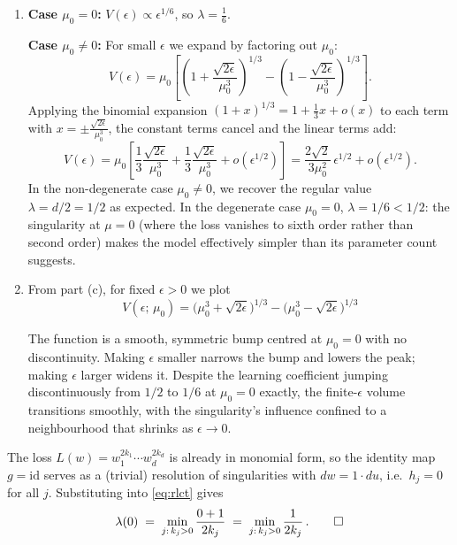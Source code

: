 \documentclass[11pt]{article}
\begin{document}
\begin{solution}
\begin{enumerate}
    \item
        \textbf{Case $\mu_0 = 0$:}
        $V(\epsilon) \propto \epsilon^{1/6}$, so
        $\lambda = \tfrac{1}{6}$.

        \textbf{Case $\mu_0 \neq 0$:}
        For small $\epsilon$ we expand by factoring out $\mu_0$:
\[
    V(\epsilon)
    = \mu_0 \left[
        \left(1 + \frac{\sqrt{2\epsilon}}{\mu_0^3}\right)^{\!1/3}
        - \left(1 - \frac{\sqrt{2\epsilon}}{\mu_0^3}\right)^{\!1/3}
    \right].
\]
Applying the binomial expansion $(1+x)^{1/3} = 1 + \tfrac{1}{3}x + o(x)$ to each term with $x = \pm\frac{\sqrt{2\epsilon}}{\mu_0^3}$, the constant terms cancel and the linear terms add:
\[
    V(\epsilon)
    = \mu_0 \left[
        \frac{1}{3}\frac{\sqrt{2\epsilon}}{\mu_0^3}
        + \frac{1}{3}\frac{\sqrt{2\epsilon}}{\mu_0^3}
        + o(\epsilon^{1/2})
    \right]
    = \frac{2\sqrt{2}}{3\mu_0^2}\,\epsilon^{1/2} + o(\epsilon^{1/2}).
\]
        In the non-degenerate case $\mu_0 \neq 0$, we recover the regular
        value $\lambda = d/2 = 1/2$ as expected.
        In the degenerate case $\mu_0 = 0$, $\lambda = 1/6 < 1/2$: the
        singularity at $\mu = 0$ (where the loss vanishes to sixth order
        rather than second order) makes the model effectively simpler than
        its parameter count suggests.

    \item From part (c), for fixed $\epsilon > 0$ we plot
\[
    V(\epsilon;\, \mu_0)
    = \bigl(\mu_0^3 + \sqrt{2\epsilon}\bigr)^{1/3}
    - \bigl(\mu_0^3 - \sqrt{2\epsilon}\bigr)^{1/3}
\]

The function is a smooth, symmetric bump centred at $\mu_0 = 0$ with no discontinuity. Making $\epsilon$ smaller narrows the bump and lowers the peak; making $\epsilon$ larger widens it. Despite the learning coefficient jumping discontinuously from $1/2$ to $1/6$ at $\mu_0 = 0$ exactly, the finite-$\epsilon$ volume transitions smoothly, with the singularity's influence confined to a neighbourhood that shrinks as $\epsilon \to 0$.
\end{enumerate}
\end{solution}

\begin{solution}
The loss $L(w) = w_1^{2k_1}\cdots w_d^{2k_d}$ is already in monomial
form, so the identity map $g = \mathrm{id}$ serves as a
(trivial) resolution of singularities with $dw = 1 \cdot du$,
i.e.\ $h_j = 0$ for all $j$.
Substituting into \eqref{eq:rlct} gives
\[
    \lambda(0)
    \;=\; \min_{j:\, k_j > 0} \frac{0 + 1}{2k_j}
    \;=\; \min_{j:\, k_j > 0} \frac{1}{2k_j}\,. \qedhere
\]
\end{solution}
\end{document}
